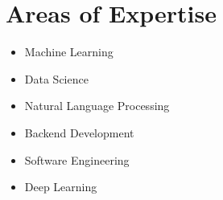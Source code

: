 \section{Areas of Expertise}
\begin{flushleft}
    \begin{minipage}[t]{0.33\textwidth}
            \begin{itemize}
                \item Machine Learning
                \item Data Science
            \end{itemize}
    \end{minipage}%
    \begin{minipage}[t]{0.4\textwidth}
            \begin{itemize}
                \item Natural Language Processing
                \item Backend Development
            \end{itemize}
    \end{minipage}%
    \begin{minipage}[t]{0.24\textwidth}
            \begin{itemize}
                \item Software Engineering
                \item Deep Learning
            \end{itemize}
    \end{minipage}
\end{flushleft}